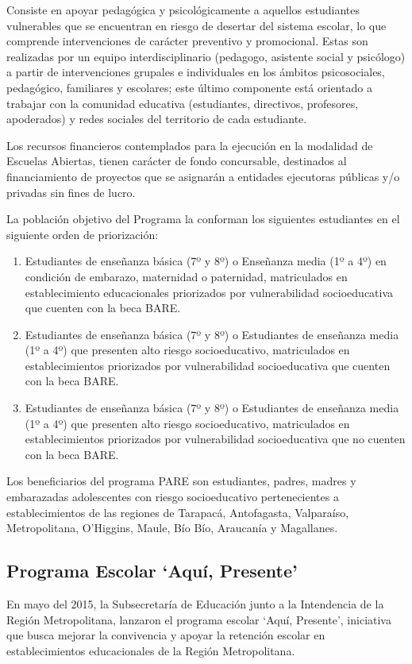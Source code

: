 Consiste en apoyar pedagógica y psicológicamente a aquellos estudiantes vulnerables que se encuentran en riesgo de desertar del sistema escolar, lo que comprende intervenciones de carácter preventivo y promocional. Estas son realizadas por un equipo interdisciplinario (pedagogo, asistente social y psicólogo) a partir de intervenciones grupales e individuales en los ámbitos psicosociales, pedagógico, familiares y escolares; este último componente está orientado a trabajar con la comunidad educativa (estudiantes, directivos, profesores, apoderados) y redes sociales del territorio de cada estudiante.

Los recursos financieros contemplados para la ejecución en la modalidad de Escuelas Abiertas, tienen carácter de fondo concursable, destinados al financiamiento de proyectos que se asignarán a entidades ejecutoras públicas y/o privadas sin fines de lucro.

La población objetivo del Programa la conforman los siguientes estudiantes en el siguiente orden de priorización:
\begin{enumerate}
\item Estudiantes de enseñanza básica (7º y 8º) o Enseñanza media (1º a 4º) en condición de embarazo, maternidad o paternidad, matriculados en establecimiento educacionales priorizados por vulnerabilidad socioeducativa que cuenten con la beca BARE.
\item Estudiantes de enseñanza básica (7º y 8º) o Estudiantes de enseñanza media (1º a 4º) que presenten alto riesgo socioeducativo, matriculados en establecimientos priorizados por vulnerabilidad socioeducativa que cuenten con la beca BARE.
\item Estudiantes de enseñanza básica (7º y 8º) o Estudiantes de enseñanza media (1º a 4º) que presenten alto riesgo socioeducativo, matriculados en establecimientos priorizados por vulnerabilidad socioeducativa que no cuenten con la beca BARE.
\end{enumerate}

Los beneficiarios del programa PARE son estudiantes, padres, madres y embarazadas adolescentes con riesgo socioeducativo pertenecientes a establecimientos de las regiones de Tarapacá, Antofagasta, Valparaíso, Metropolitana, O'Higgins, Maule, Bío Bío, Araucanía y Magallanes. \cite{pare}

\subsection{Programa Escolar `Aquí, Presente'}
En mayo del 2015, la Subsecretaría de Educación junto a la Intendencia de la Región Metropolitana, lanzaron el programa escolar `Aquí, Presente', iniciativa que busca mejorar la convivencia y apoyar la retención escolar en establecimientos educacionales de la Región Metropolitana.

